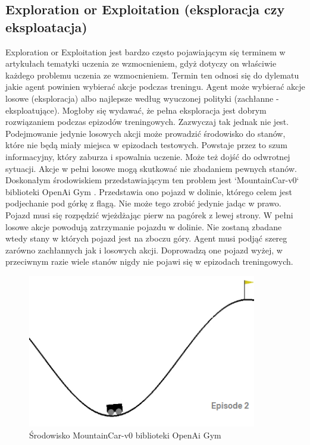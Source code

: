 \documentclass[12pt]{book}
\theoremstyle{plain}
\begin{document}
\subsection*{Exploration or Exploitation (eksploracja czy eksploatacja)}
Exploration or Exploitation jest bardzo często pojawiającym się terminem w artykułach tematyki uczenia ze wzmocnieniem\cite{exploration_or_exploitation}, gdyż dotyczy on właściwie każdego problemu uczenia ze wzmocnieniem. Termin ten odnosi się do dylematu jakie agent powinien wybierać akcje podczas treningu. Agent może wybierać akcje losowe (eksploracja) albo najlepsze według wyuczonej polityki (zachłanne - eksploatujące). Mogłoby się wydawać, że pełna eksploracja jest dobrym rozwiązaniem podczas epizodów treningowych. Zazwyczaj tak jednak nie jest. Podejmowanie jedynie losowych akcji może prowadzić środowisko do stanów, które nie będą miały miejsca w epizodach testowych. Powstaje przez to szum informacyjny, który zaburza i spowalnia uczenie. Może też dojść do odwrotnej sytuacji. Akcje w pełni losowe mogą skutkować nie zbadaniem pewnych stanów. Doskonałym środowiskiem przedstawiającym ten problem jest `MountainCar-v0` biblioteki OpenAi Gym \cite{openai}. Przedstawia ono pojazd w dolinie, którego celem jest podjechanie pod górkę z flagą. Nie może tego zrobić jedynie jadąc w prawo. Pojazd musi się rozpędzić wjeżdżając pierw na pagórek z lewej strony. W pełni losowe akcje powodują zatrzymanie pojazdu w dolinie. Nie zostaną zbadane wtedy stany w których pojazd jest na zboczu góry. Agent musi podjąć szereg zarówno zachłannych jak i losowych akcji. Doprowadzą one pojazd wyżej, w przeciwnym razie wiele stanów nigdy nie pojawi się w epizodach treningowych.
\begin{figure}[H]
	\centering
	\includegraphics[width=10cm]{images/mountain_car}
	\caption{Środowisko MountainCar-v0 biblioteki OpenAi Gym }
	\label{fig:mountain-ca}
\end{figure}\noindent
\end{document}
